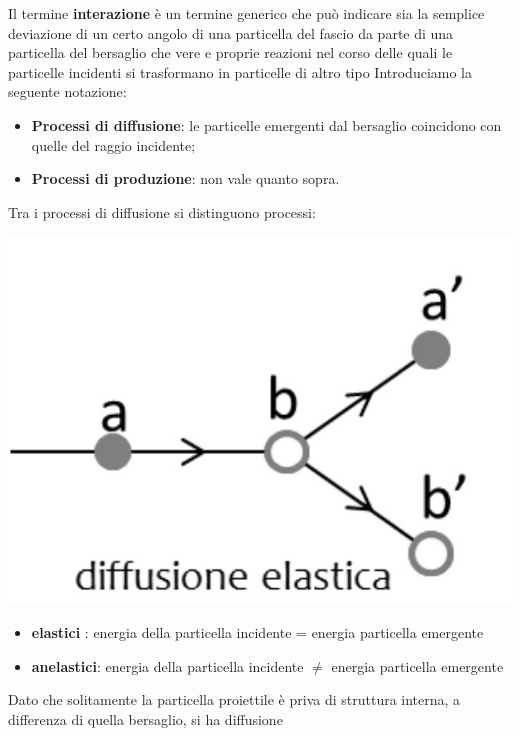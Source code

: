 Il termine \textbf{interazione} è un termine generico che può indicare sia la semplice deviazione di un certo angolo
di una particella del fascio da parte di una particella del bersaglio che vere e proprie reazioni nel corso delle quali
le particelle incidenti si trasformano in particelle di altro tipo
Introduciamo la seguente notazione:
\begin{itemize}
	\tightlist
	\item
	\textbf{Processi di diffusione}: le particelle emergenti dal bersaglio
	coincidono con quelle del raggio incidente;
	\item
	\textbf{Processi di produzione}: non vale quanto sopra.
\end{itemize}
Tra i processi di diffusione si distinguono processi:
\begin{marginfigure}
	\includegraphics{figs/diffusione-elastica}
	\label{fig:diffusione-elastica}
\end{marginfigure}
\begin{itemize}
	\tightlist
	\item
	\textbf{elastici} : energia della particella incidente = energia particella emergente
	\item
	\textbf{anelastici}: energia della particella incidente \(\neq\) energia particella emergente
\end{itemize}
Dato che solitamente la particella proiettile è priva di struttura
interna, a differenza di quella bersaglio, si ha diffusione
